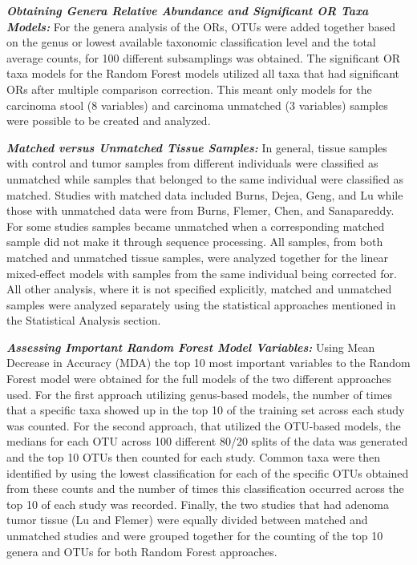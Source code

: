\documentclass[12pt,]{article}
\begin{document}
\textbf{\emph{Obtaining Genera Relative Abundance and Significant OR
Taxa Models:}} For the genera analysis of the ORs, OTUs were added
together based on the genus or lowest available taxonomic classification
level and the total average counts, for 100 different subsamplings was
obtained. The significant OR taxa models for the Random Forest models
utilized all taxa that had significant ORs after multiple comparison
correction. This meant only models for the carcinoma stool (8 variables)
and carcinoma unmatched (3 variables) samples were possible to be
created and analyzed.

\textbf{\emph{Matched versus Unmatched Tissue Samples:}} In general,
tissue samples with control and tumor samples from different individuals
were classified as unmatched while samples that belonged to the same
individual were classified as matched. Studies with matched data
included Burns, Dejea, Geng, and Lu while those with unmatched data were
from Burns, Flemer, Chen, and Sanapareddy. For some studies samples
became unmatched when a corresponding matched sample did not make it
through sequence processing. All samples, from both matched and
unmatched tissue samples, were analyzed together for the linear
mixed-effect models with samples from the same individual being
corrected for. All other analysis, where it is not specified explicitly,
matched and unmatched samples were analyzed separately using the
statistical approaches mentioned in the Statistical Analysis section.

\textbf{\emph{Assessing Important Random Forest Model Variables:}} Using
Mean Decrease in Accuracy (MDA) the top 10 most important variables to
the Random Forest model were obtained for the full models of the two
different approaches used. For the first approach utilizing genus-based
models, the number of times that a specific taxa showed up in the top 10
of the training set across each study was counted. For the second
approach, that utilized the OTU-based models, the medians for each OTU
across 100 different 80/20 splits of the data was generated and the top
10 OTUs then counted for each study. Common taxa were then identified by
using the lowest classification for each of the specific OTUs obtained
from these counts and the number of times this classification occurred
across the top 10 of each study was recorded. Finally, the two studies
that had adenoma tumor tissue (Lu and Flemer) were equally divided
between matched and unmatched studies and were grouped together for the
counting of the top 10 genera and OTUs for both Random Forest
approaches.
\end{document}
